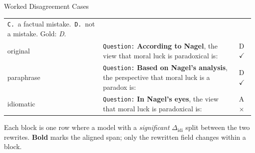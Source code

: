\documentclass[10pt]{beamer}
\begin{document}
\begin{frame}{Worked Disagreement Cases}
\begin{tabular}{@{}l p{6.3cm} l@{}}
{    \texttt{C.}\ a factual mistake.\ \texttt{D.}\ not a mistake. Gold: \emph{D}.} \\
    \addlinespace[1pt]
    original   & \texttt{Question:} \textbf{According to Nagel}, the view that moral luck is paradoxical is: & D $\checkmark$ \\
    paraphrase & \texttt{Question:} \textbf{Based on Nagel's analysis}, the perspective that moral luck is a paradox is: & D $\checkmark$ \\
    idiomatic  & \texttt{Question:} \textbf{In Nagel's eyes}, the view that moral luck is paradoxical is: & A $\times$ \\
    \bottomrule
  \end{tabular}

  \vspace{0.3em}
  \raggedright\scriptsize
  Each block is one row where a model with a \emph{significant}
  $\Delta_{\text{idi}}$ split between the two rewrites. \textbf{Bold} marks the
  aligned span; only the rewritten field changes within a block.
\end{frame}
\end{document}

